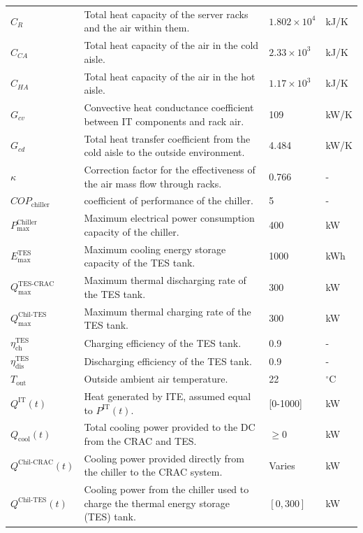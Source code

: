 \documentclass[lettersize,journal]{IEEEtran}
\providecommand{\DIFadd}[1]{{\color{blue}#1}}
\providecommand{\DIFaddFL}[1]{\DIFadd{#1}}
\begin{document}
{{\begin{longtable}{p{} p{} p{} p{}}
$C_R$ & Total heat capacity of the server racks and the air within them. & $1.802 \times 10^4$ & kJ/K \\
$C_{CA}$ & Total heat capacity of the air in the cold aisle. & $2.33 \times 10^3$ & kJ/K \\
$C_{HA}$ & Total heat capacity of the air in the hot aisle. & $1.17 \times 10^3$ & kJ/K \\
$G_{cv}$ & Convective heat conductance coefficient between IT components and rack air. & 109 &kW/K \\
$G_{cd}$ & Total heat transfer coefficient from the cold aisle to the outside environment. & 4.484 &kW/K \\
$\kappa$ & Correction factor for the effectiveness of the air mass flow through racks. & 0.766 & - \\
$COP_{\mathrm{chiller}}$ & \DIFaddFL{coefficient of performance of the chiller.} & 5 & - \\
$P^{\mathrm{Chiller}}_{\mathrm{max}}$ & Maximum electrical power consumption capacity of the chiller. & 400 &kW \\
$E^{\mathrm{TES}}_{\mathrm{max}}$ & Maximum cooling energy storage capacity of the TES tank. & 1000 &kWh \\
$Q^{\mathrm{TES}\text{-}\mathrm{CRAC}}_{\mathrm{max}}$ & \DIFaddFL{Maximum thermal discharging rate of the TES tank.} & 300 &kW \\
$Q^{\mathrm{Chil}\text{-}\mathrm{TES}}_{\mathrm{max}}$ & \DIFaddFL{Maximum thermal charging rate of the TES tank.} & 300 &kW \\
$\eta^{\mathrm{TES}}_{\mathrm{ch}}$ & Charging efficiency of the TES tank. & 0.9 & - \\
$\eta^{\mathrm{TES}}_{\mathrm{dis}}$ & Discharging efficiency of the TES tank. & 0.9 & - \\
$T_{\mathrm{out}}$ & Outside ambient air temperature. & 22 & $^{\circ}$C \\
$Q^{\mathrm{IT}}(t)$ & Heat generated by ITE, assumed equal to $P^{\mathrm{IT}}(t)$. & [0-1000] &kW \\
$Q_{\mathrm{cool}}(t)$ & Total cooling power provided to the DC from the CRAC and TES. & $\geq 0$ &kW \\
$Q^{\mathrm{Chil}\text{-}\mathrm{CRAC}}(t)$ & Cooling power provided directly from the chiller to the CRAC system. & Varies &kW \\
$Q^{\mathrm{Chil}\text{-}\mathrm{TES}}(t)$ & \DIFaddFL{Cooling power from the chiller used to charge the thermal energy storage (TES) tank.} & $[0, 300]$ &kW \\

\end{longtable}}}
\end{document}
